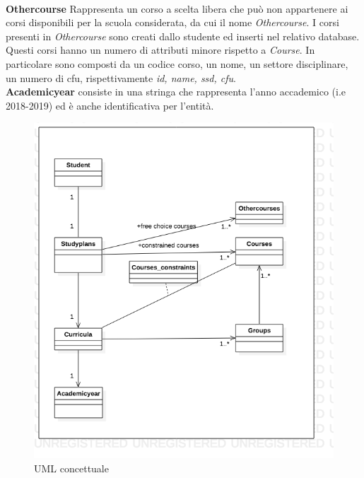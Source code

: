\documentclass{article}
\begin{document}
\\
\textbf{Othercourse} Rappresenta un corso a scelta libera che può non appartenere ai corsi disponibili per la scuola considerata, da cui il nome \emph{Othercourse}. I corsi presenti in \emph{Othercourse} sono creati dallo studente ed inserti nel relativo database. Questi corsi hanno un numero di attributi minore rispetto a \emph{Course}. In particolare sono  composti da  un codice corso, un nome, un settore disciplinare, un numero di cfu, rispettivamente  \emph{id, name, ssd, cfu}.
\\
\textbf{Academicyear} consiste in una stringa che rappresenta l'anno accademico (i.e 2018-2019) ed è anche identificativa per l'entità.


\begin{figure}[H]
  \begin{center}
   \includegraphics[width=.6\textwidth]{img/UMLconcettuale.png}
     \caption{UML concettuale}
  \label{fig:EntityRelationshipdiagram1}
  \end{center}
\end{figure}
\end{document}
